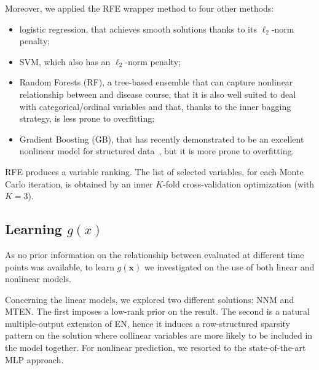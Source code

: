 Moreover, we applied the RFE wrapper method to four other methods:
\begin{itemize}
	\item logistic regression, that achieves smooth solutions thanks to its $\ell_2$-norm penalty;
	\item SVM, which also has an $\ell_2$-norm penalty;
	\item Random Forests (RF), a tree-based ensemble that can capture nonlinear relationship between \PCOs and disease course, that it is also well suited to deal with categorical/ordinal variables and that, thanks to the inner bagging strategy, is less prone to overfitting;
	\item Gradient Boosting (GB), that has recently demonstrated to be an excellent nonlinear model for structured data~\cite{chollet2018deep}, but it is more prone to overfitting.
\end{itemize}
RFE produces a variable ranking. The list of selected variables, for each Monte Carlo iteration, is obtained by an inner $K$-fold cross-validation optimization (with $K=3$).


\subsection{Learning $g(x)$}

As no prior information on the relationship between \PCOs evaluated at different time points was available, to learn $g(\bm{x})$ we investigated on the use of both linear and nonlinear models.

Concerning the linear models, we explored two different solutions: NNM and MTEN. The first imposes a low-rank prior on the result. The second is a natural multiple-output extension of EN, hence it induces a row-structured sparsity pattern on the solution where collinear variables are more likely to be included in the model together. For nonlinear prediction, we resorted to the state-of-the-art MLP approach.

